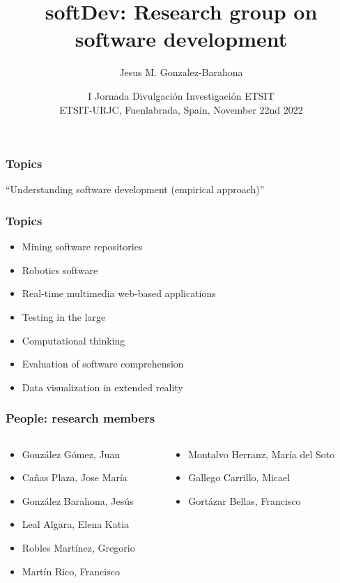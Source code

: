 \documentclass[17pt,aspectratio=169,hyperref={pdfusetitle,colorlinks,allcolors=olive}]{beamer}
\title[softDev]{softDev: Research group on software development}
\author[Jesus M. Gonzalez-Barahona]{Jesus M. Gonzalez-Barahona}
\institute[URJC]{Universidad Rey Juan Carlos \\
  \url{https://floss.social/@jgbarah} ~~~~~ \url{https://jgbarah.github.io/presentations}}
\date[Open Science Workshop, 2022]{\small  I Jornada Divulgación Investigación ETSIT \\
  ETSIT-URJC, Fuenlabrada, Spain, November 22nd 2022}
\begin{document}
\begin{frame}
  \maketitle
\end{frame}


\begin{frame}[fragile]
  \frametitle{Topics}

  {\Large \center
  ``Understanding software development (empirical approach)''
}

\end{frame}

\begin{frame}[fragile]
  \frametitle{Topics}

  \begin{itemize}
  \item Mining software repositories
  \item Robotics software
  \item Real-time multimedia web-based applications
  \item Testing in the large
  \item Computational thinking
  \item Evaluation of software comprehension
  \item Data visualization in extended reality
  \end{itemize}
\end{frame}

\begin{frame}[fragile]
  \frametitle{People: research members}

  {\footnotesize
  \begin{columns}[T]
    \begin{column}{.48\textwidth}

      \begin{itemize}
      \item González Gómez, Juan
      \item Cañas Plaza, Jose María
      \item González Barahona, Jesús
      \item Leal Algara, Elena Katia
      \item Robles Martínez, Gregorio
      \item Martín Rico, Francisco
      \end{itemize}
    \end{column}%
    \hfill%
    \begin{column}{.48\textwidth}
      \begin{itemize}
      \item Montalvo Herranz, María del Soto
      \item Gallego Carrillo, Micael
      \item Gortázar Bellas, Francisco
      \end{itemize}
    \end{column}%
  \end{columns}
}
\end{frame}
\end{document}
